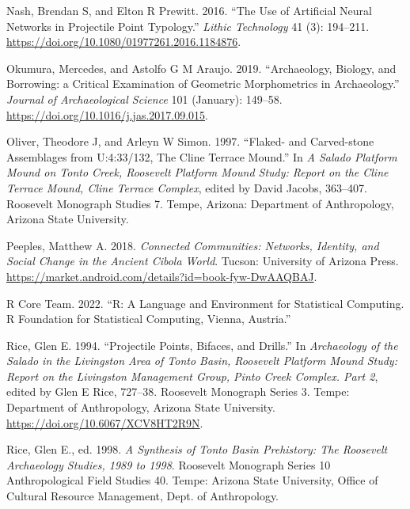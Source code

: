\documentclass{article}
\newlength{\cslhangindent}
\newlength{\cslentryspacingunit} %
\newenvironment{CSLReferences}[2] %
 {%
  \setlength{\parindent}{0pt}
  \ifodd #1
  \let\oldpar\par
  \def\par{\hangindent=\cslhangindent\oldpar}
  \fi
  \setlength{\parskip}{#2\cslentryspacingunit}
 }%
 {}
\begin{document}
\begin{CSLReferences}{1}{0}
\leavevmode{}%
Nash, Brendan S, and Elton R Prewitt. 2016. {``{The Use of Artificial
Neural Networks in Projectile Point Typology}.''} \emph{Lithic
Technology} 41 (3): 194--211.
\url{https://doi.org/10.1080/01977261.2016.1184876}.

\leavevmode{}%
Okumura, Mercedes, and Astolfo G M Araujo. 2019. {``{Archaeology,
Biology, and Borrowing: a Critical Examination of Geometric
Morphometrics in Archaeology}.''} \emph{Journal of Archaeological
Science} 101 (January): 149--58.
\url{https://doi.org/10.1016/j.jas.2017.09.015}.

\leavevmode{}%
Oliver, Theodore J, and Arleyn W Simon. 1997. {``{Flaked- and
Carved-stone Assemblages from U:4:33/132, The Cline Terrace Mound}.''}
In \emph{{A Salado Platform Mound on Tonto Creek, Roosevelt Platform
Mound Study: Report on the Cline Terrace Mound, Cline Terrace Complex}},
edited by David Jacobs, 363--407. Roosevelt Monograph Studies 7. Tempe,
Arizona: Department of Anthropology, Arizona State University.

\leavevmode{}%
Peeples, Matthew A. 2018. \emph{{Connected {Communities}: {Networks},
{Identity}, and {Social} {Change} in the {Ancient} {Cibola} {World}}}.
Tucson: University of Arizona Press.
\url{https://market.android.com/details?id=book-fyw-DwAAQBAJ}.

\leavevmode{}%
R Core Team. 2022. {``{R: {A} {Language} and {Environment} for
{Statistical} {Computing}. {R} {Foundation} for {Statistical}
{Computing}, {Vienna}, {Austria}}.''}

\leavevmode{}%
Rice, Glen E. 1994. {``Projectile Points, Bifaces, and Drills.''} In
\emph{Archaeology of the {Salado} in the {Livingston} Area of {Tonto
Basin}, {Roosevelt Platform Mound Study}: Report on the {Livingston
Management Group, Pinto Creek Complex}. Part 2}, edited by Glen E Rice,
727--38. Roosevelt Monograph Series 3. Tempe: Department of
Anthropology, Arizona State University.
\url{https://doi.org/10.6067/XCV8HT2R9N}.

\leavevmode{}%
Rice, Glen E., ed. 1998. \emph{{A {Synthesis} of {Tonto} {Basin}
{Prehistory}: {The} {Roosevelt} {Archaeology} {Studies}, 1989 to 1998}}.
Roosevelt Monograph Series 10 Anthropological Field Studies 40. Tempe:
Arizona State University, Office of Cultural Resource Management, Dept.
of Anthropology.


\end{CSLReferences}
\end{document}
